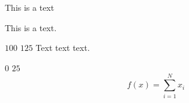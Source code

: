 


This is a text

This is a text.

\begin{figure}[h]
\centering

\end{figure}
$100$ $125$
Text text text.

$0$  $25$
\begin{equation}
f(x) = \sum\limits_{i=1}^N x_i
\end{equation}
